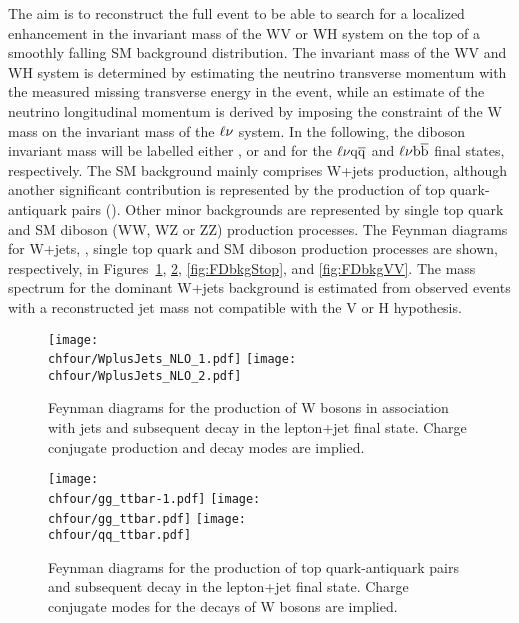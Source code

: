 The aim is to reconstruct the full event to be able to search for a localized enhancement in the invariant mass of the WV or WH system on the top of a smoothly falling SM background distribution.
The invariant mass of the WV and WH system is determined by estimating the neutrino transverse momentum with the measured missing transverse energy in the event,
while an estimate of the neutrino longitudinal momentum is derived by imposing the constraint of the W mass on the invariant mass of the $\ell\nu$ system.
In the following, the diboson invariant mass will be labelled either \mlvj, or \mWV and \mWH for the $\ell\nu\mathrm{q}\overline{\mathrm{q}}$ and $\ell\nu{\mathrm{b}\overline{\mathrm{b}}}$ final states, respectively.
The SM background mainly comprises W+jets production, although another significant contribution is represented by the production of top quark-antiquark pairs (\ttbar).
Other minor backgrounds are represented by single top quark and SM diboson (WW, WZ or ZZ) production processes.
The Feynman diagrams for W+jets, \ttbar, single top quark and SM diboson production processes are shown, respectively, in Figures~\ref{fig:FDbkgWJets}, \ref{fig:FDbkgttbar}, \ref{fig:FDbkgStop}, and \ref{fig:FDbkgVV}.
The mass spectrum for the dominant W+jets background is estimated from observed events with a reconstructed jet mass not compatible with the V or H hypothesis.\\ 

\begin{figure}[!htb]
\centering
\texttt{[image: \\chfour/WplusJets\_NLO\_1.pdf]}
\texttt{[image: \\chfour/WplusJets\_NLO\_2.pdf]}
\caption{Feynman diagrams for the production of W bosons in association with jets and subsequent decay in the lepton+jet final state. Charge conjugate production and decay modes are implied.}
\label{fig:FDbkgWJets}
\end{figure}

\begin{figure}[!htb]
\centering
\texttt{[image: \\chfour/gg\_ttbar-1.pdf]}
\texttt{[image: \\chfour/gg\_ttbar.pdf]}
\texttt{[image: \\chfour/qq\_ttbar.pdf]}
\caption{Feynman diagrams for the production of top quark-antiquark pairs and subsequent decay in the lepton+jet final state. Charge conjugate modes for the decays of W bosons are implied.}
\label{fig:FDbkgttbar}
\end{figure}

